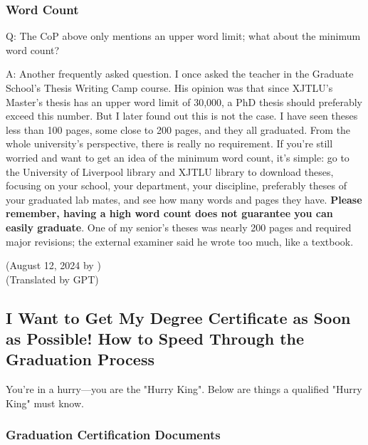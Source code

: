 \subsubsection{Word Count}

Q: The CoP above only mentions an upper word limit; what about the minimum word count?

A: Another frequently asked question. I once asked the teacher in the Graduate School's Thesis Writing Camp course. His opinion was that since XJTLU's Master's thesis has an upper word limit of 30,000, a PhD thesis should preferably exceed this number. But I later found out this is not the case. I have seen theses less than 100 pages, some close to 200 pages, and they all graduated. From the whole university's perspective, there is really no requirement. If you're still worried and want to get an idea of the minimum word count, it's simple: go to the University of Liverpool library and XJTLU library to download theses, focusing on your school, your department, your discipline, preferably theses of your graduated lab mates, and see how many words and pages they have. \textbf{Please remember, having a high word count does not guarantee you can easily graduate}. One of my senior's theses was nearly 200 pages and required major revisions; the external examiner said he wrote too much, like a textbook.

\begin{flushright}
    (August 12, 2024 by \Wu) \\
    (Translated by GPT)
\end{flushright}



\subsection{I Want to Get My Degree Certificate as Soon as Possible! How to Speed Through the Graduation Process}

You're in a hurry—you are the "Hurry King". Below are things a qualified "Hurry King" must know.

\subsubsection{Graduation Certification Documents}

